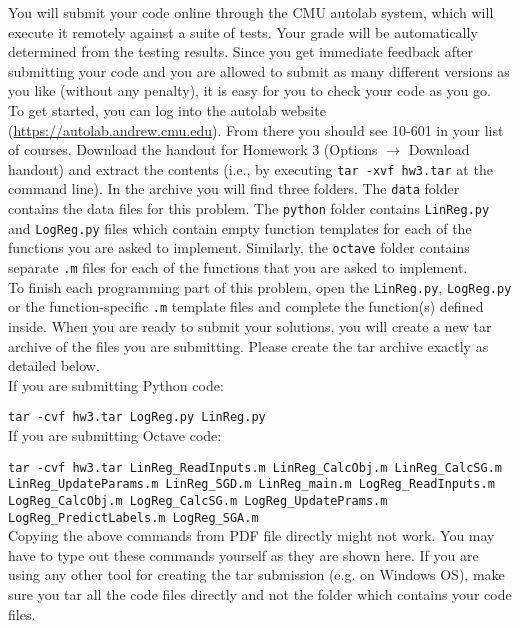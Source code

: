 \documentclass[a4paper]{article}
\theoremstyle{definition}
\begin{document}
You will submit your code online through the CMU autolab system, which will execute it
remotely against a suite of tests. Your grade will be automatically
determined from the testing results. Since you get immediate feedback
after submitting your code and you are allowed to submit as many
different versions as you like (without any penalty), it is easy for
you to check your code as you go. \\

To get started, you can log into the autolab website
(\url{https://autolab.andrew.cmu.edu}). From there you should see 10-601
in your list of courses. Download the handout for Homework 3 (Options $\rightarrow$ Download handout) and extract the contents (i.e., by executing \texttt{tar -xvf hw3.tar} at the
command line). In the archive you will find three folders. The \texttt{data} folder contains the data files for this problem. The \texttt{python} folder contains \texttt{LinReg.py} and \texttt{LogReg.py} files which contain empty function templates for each of the functions you are asked to implement. Similarly, the \texttt{octave} folder contains separate \texttt{.m} files for each of the functions that you are asked to implement.\\

To finish each programming part of this problem, open the \texttt{LinReg.py}, \texttt{LogReg.py} or the function-specific \texttt{.m} template files and complete the function(s) defined inside. When you are ready to submit your solutions, you will create a new tar archive of the files you are submitting. Please create the tar archive exactly as detailed below.\\

If you are submitting Python code: 

\texttt{tar -cvf hw3.tar LogReg.py LinReg.py}\\

If you are submitting Octave code: 

\texttt{tar -cvf hw3.tar LinReg\_ReadInputs.m LinReg\_CalcObj.m LinReg\_CalcSG.m LinReg\_UpdateParams.m LinReg\_SGD.m LinReg\_main.m LogReg\_ReadInputs.m LogReg\_CalcObj.m LogReg\_CalcSG.m LogReg\_UpdatePrams.m LogReg\_PredictLabels.m LogReg\_SGA.m} \\

Copying the above commands from PDF file directly might not work. You may have to type out these commands yourself as they are shown here. If you are using any other tool for creating the tar submission (e.g. on Windows OS), make sure you tar all the code files directly and not the folder which contains your code files.\\
\end{document}
